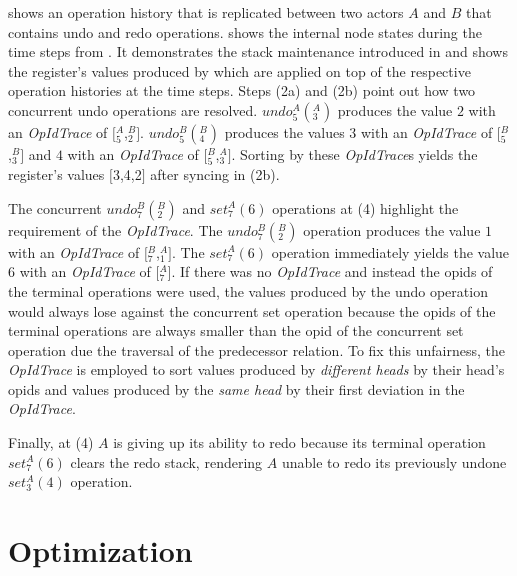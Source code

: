 \documentclass[sigplan,natbib=false,review]{acmart}
\newcommand{\opid}[2]{$\mathit{_{#1}^{#2}}$}
\newcommand{\setop}[4][set]{$\mathit{#1_{#2}^{#3}}{(#4)}$}
\newcommand{\undop}[5][undo]{$\mathit{#1_{#2}^{#3}}{(_{#4}^{#5})}$}
\newcommand{\stack}[1]{$[$#1$]$}
\newcommand{\opidtrace}{\textit{OpIdTrace}}
\begin{document}
 shows an operation history that is replicated
between two actors $A$ and $B$ that contains undo and redo operations.
 shows the internal node states during the time steps
from .
It demonstrates the stack maintenance introduced in  and
shows the register's values produced by
 which are applied on top
of the respective operation histories at the time steps.
Steps (2a) and (2b) point out how two concurrent undo operations are resolved.
\undop{5}{A}{3}{A} produces the value $2$ with an \opidtrace{} of
\stack{\opid{5}{A},\opid{2}{B}}.
\undop{5}{B}{4}{B} produces the values $3$ with an \opidtrace{} of
\stack{\opid{5}{B},\opid{3}{B}}
and $4$ with an \opidtrace{} of
\stack{\opid{5}{B},\opid{3}{A}}.
Sorting by these \opidtrace{}s yields the register's values \stack{3,4,2}
after syncing in (2b).

The concurrent \undop{7}{B}{2}{B} and \setop{7}{A}{6} operations at (4) highlight
the requirement of the \opidtrace{}.
The \undop{7}{B}{2}{B} operation produces the value $1$ with an \opidtrace{} of
\stack{\opid{7}{B},\opid{1}{A}}.
The \setop{7}{A}{6} operation immediately yields the value $6$ with an
\opidtrace{} of \stack{\opid{7}{A}}.
If there was no \opidtrace{} and instead the \glspl*{opid} of the terminal
operations were used, the values produced by the undo operation would
always lose against the concurrent set operation because the \glspl*{opid} of the
terminal operations are always smaller than the \gls*{opid} of the concurrent
set operation due the traversal of the predecessor relation.
To fix this unfairness, the \opidtrace{} is employed to sort values produced by
\emph{different heads} by their head's \glspl*{opid} and
values produced by the \emph{same head}
by their first deviation in the \opidtrace{}.

Finally, at (4) $A$ is giving up its ability to redo because its terminal
operation \setop{7}{A}{6} clears the redo stack, rendering $A$ unable to redo its
previously undone \setop{3}{A}{4} operation.

\section{Optimization}\label{sec:opt}

\end{document}
